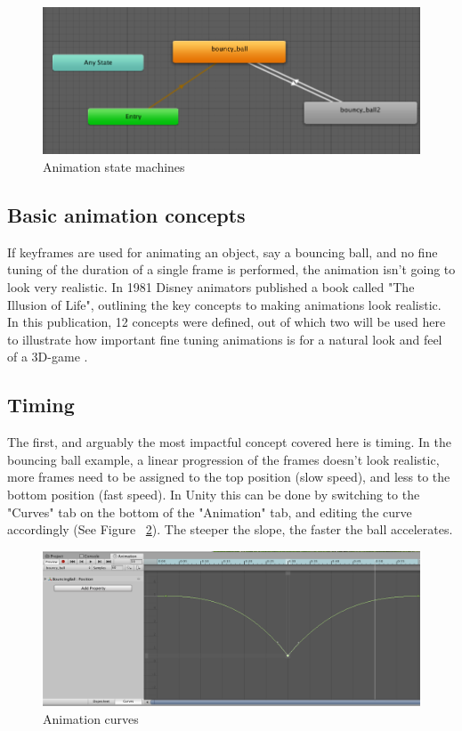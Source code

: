 \documentclass[12pt, a4paper, titlepage]{article}
\begin{document}
\begin{figure}[htbp]
  \centering
  \includegraphics[width=.4\textwidth]{pictures/animation_states}
  \caption{Animation state machines}
  \label{fig:adding_animations_state_machines}
\end{figure}

\subsection{Basic animation concepts}

If keyframes are used for animating an object, say a bouncing ball, and no fine tuning of the duration of a single frame is performed, the animation isn't going to look very realistic. In 1981 Disney animators published a book called "The Illusion of Life", outlining the key concepts to making animations look realistic. In this publication, 12 concepts were defined, out of which two will be used here to illustrate how important fine tuning animations is for a natural look and feel of a 3D-game \cite{b3}.

\subsection{Timing}

The first, and arguably the most impactful concept covered here is timing. In the bouncing ball example, a linear progression of the frames doesn't look realistic, more frames need to be assigned to the top position (slow speed), and less to the bottom position (fast speed). In Unity this can be done by switching to the "Curves" tab on the bottom of the "Animation" tab, and editing the curve accordingly (See Figure ~\ref{fig:adding_animations_curves}). The steeper the slope, the faster the ball accelerates.

\begin{figure}[htbp]
  \centering
  \includegraphics[width=.4\textwidth]{pictures/animation_curves}
  \caption{Animation curves}
  \label{fig:adding_animations_curves}
\end{figure}
\end{document}
